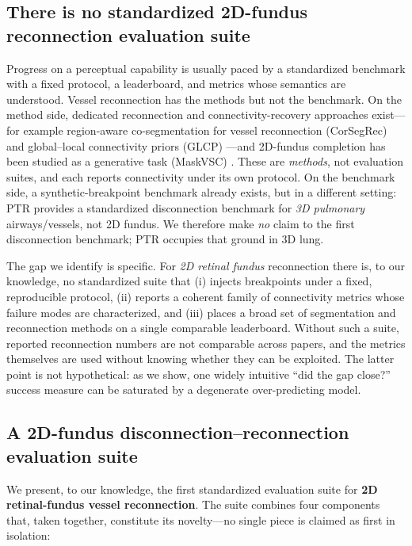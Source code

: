 \subsection{There is no standardized 2D-fundus reconnection evaluation suite}
\label{sec:intro:gap}

Progress on a perceptual capability is usually paced by a standardized
benchmark with a fixed protocol, a leaderboard, and metrics whose semantics
are understood. Vessel reconnection has the methods but not the benchmark.
On the method side, dedicated reconnection and connectivity-recovery
approaches exist---for example region-aware co-segmentation for vessel
reconnection (CorSegRec) \cite{TODO_corsegrec} and global--local
connectivity priors (GLCP) \cite{TODO_glcp}---and 2D-fundus completion has
been studied as a generative task (MaskVSC) \cite{TODO_maskvsc}. These are
\emph{methods}, not evaluation suites, and each reports connectivity under
its own protocol. On the benchmark side, a synthetic-breakpoint benchmark
already exists, but in a different setting: PTR \cite{TODO_ptr} provides a
standardized disconnection benchmark for \emph{3D pulmonary} airways/vessels,
not 2D fundus. We therefore make \emph{no} claim to the first disconnection
benchmark; PTR occupies that ground in 3D lung.

The gap we identify is specific. For \emph{2D retinal fundus} reconnection
there is, to our knowledge, no standardized suite that (i) injects
breakpoints under a fixed, reproducible protocol, (ii) reports a coherent
family of connectivity metrics whose failure modes are characterized, and
(iii) places a broad set of segmentation and reconnection methods on a
single comparable leaderboard. Without such a suite, reported reconnection
numbers are not comparable across papers, and the metrics themselves are
used without knowing whether they can be exploited. The latter point is not
hypothetical: as we show, one widely intuitive ``did the gap close?''
success measure can be saturated by a degenerate over-predicting model.

\subsection{A 2D-fundus disconnection--reconnection evaluation suite}
\label{sec:intro:hook}

We present, to our knowledge, the first standardized evaluation suite for
\textbf{2D retinal-fundus vessel reconnection}. The suite combines four
components that, taken together, constitute its novelty---no single piece is
claimed as first in isolation:

